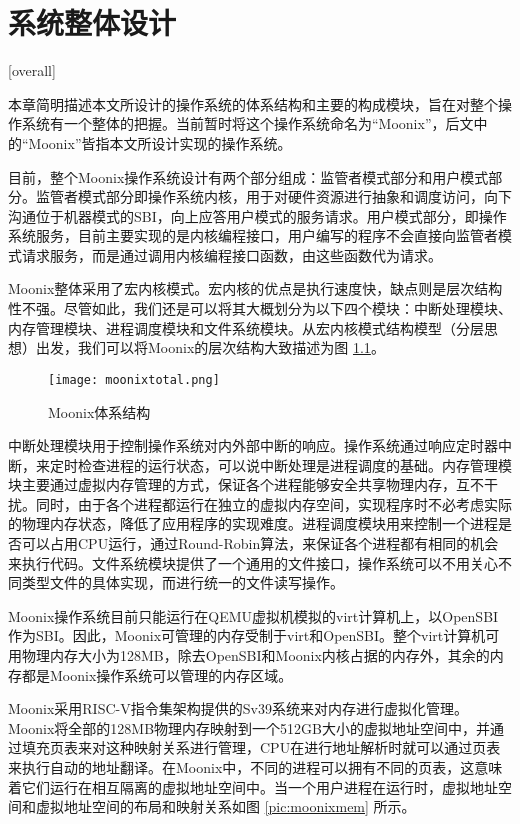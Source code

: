 
\chapter{系统整体设计}[overall]
\label{chapter:overall}

本章简明描述本文所设计的操作系统的体系结构和主要的构成模块，旨在对整个操作系统有一个整体的把握。当前暂时将这个操作系统命名为“Moonix”，后文中的“Moonix”皆指本文所设计实现的操作系统。

目前，整个Moonix操作系统设计有两个部分组成：监管者模式部分和用户模式部分。监管者模式部分即操作系统内核，用于对硬件资源进行抽象和调度访问，向下沟通位于机器模式的SBI，向上应答用户模式的服务请求。用户模式部分，即操作系统服务，目前主要实现的是内核编程接口，用户编写的程序不会直接向监管者模式请求服务，而是通过调用内核编程接口函数，由这些函数代为请求。

Moonix整体采用了宏内核模式。宏内核的优点是执行速度快，缺点则是层次结构性不强。尽管如此，我们还是可以将其大概划分为以下四个模块：中断处理模块、内存管理模块、进程调度模块和文件系统模块。从宏内核模式结构模型（分层思想）出发，我们可以将Moonix的层次结构大致描述为图 \ref{pic:moonixtotal}。

\begin{figure}[htpb]
	\centering
	\texttt{[image: moonixtotal.png]}
	\setlength{\abovecaptionskip}{2pt}
	\caption{Moonix体系结构}
	\label{pic:moonixtotal}
\end{figure}

中断处理模块用于控制操作系统对内外部中断的响应。操作系统通过响应定时器中断，来定时检查进程的运行状态，可以说中断处理是进程调度的基础。内存管理模块主要通过虚拟内存管理的方式，保证各个进程能够安全共享物理内存，互不干扰。同时，由于各个进程都运行在独立的虚拟内存空间，实现程序时不必考虑实际的物理内存状态，降低了应用程序的实现难度。进程调度模块用来控制一个进程是否可以占用CPU运行，通过Round-Robin算法\cite{DBLP:journals/eor/RasmussenT08}，来保证各个进程都有相同的机会来执行代码。文件系统模块提供了一个通用的文件接口，操作系统可以不用关心不同类型文件的具体实现，而进行统一的文件读写操作。

Moonix操作系统目前只能运行在QEMU虚拟机模拟的virt计算机上\cite{qemu/virt}，以OpenSBI作为SBI。因此，Moonix可管理的内存受制于virt和OpenSBI。整个virt计算机可用物理内存大小为128MB，除去OpenSBI和Moonix内核占据的内存外，其余的内存都是Moonix操作系统可以管理的内存区域。

Moonix采用RISC-V指令集架构提供的Sv39系统来对内存进行虚拟化管理。Moonix将全部的128MB物理内存映射到一个512GB大小的虚拟地址空间中，并通过填充页表来对这种映射关系进行管理，CPU在进行地址解析时就可以通过页表来执行自动的地址翻译。在Moonix中，不同的进程可以拥有不同的页表，这意味着它们运行在相互隔离的虚拟地址空间中。当一个用户进程在运行时，虚拟地址空间和虚拟地址空间的布局和映射关系如图 \ref{pic:moonixmem} 所示。

